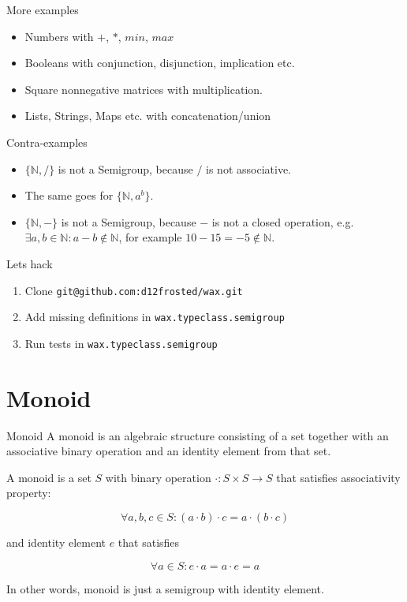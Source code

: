 \documentclass[presentation,aspectratio=169,smaller]{beamer}
\begin{document}
\begin{frame}[label={sec:org2319d22}]{More examples}
\begin{itemize}
\item Numbers with \(+\), \(*\), \(min\), \(max\)
\item Booleans with conjunction, disjunction, implication etc.
\item Square nonnegative matrices with multiplication.
\item Lists, Strings, Maps etc. with concatenation/union
\end{itemize}
\end{frame}

\begin{frame}[label={sec:orgd04373c}]{Contra-examples}
\begin{itemize}
\item \(\{\mathbb{N}, /\}\) is not a Semigroup, because \(/\) is not associative.
\item The same goes for \(\{\mathbb{N}, a^b \}\).
\item \(\{\mathbb{N}, -\}\) is not a Semigroup, because \(-\) is not a closed operation,
e.g. \(\exists a, b \in \mathbb{N}: a - b \notin \mathbb{N}\),
for example \(10 - 15 = -5 \notin \mathbb{N}\).
\end{itemize}
\end{frame}

\begin{frame}[label={sec:orgfa7c860},fragile]{Lets hack}
 \begin{enumerate}
\item Clone \texttt{git@github.com:d12frosted/wax.git}
\item Add missing definitions in \texttt{wax.typeclass.semigroup}
\item Run tests in \texttt{wax.typeclass.semigroup}
\end{enumerate}
\end{frame}

\section*{Monoid}
\label{sec:orgacaea69}

\begin{frame}[label={sec:orgfc3a53d}]{Monoid}
A monoid is an algebraic structure consisting of a set together with an
associative binary operation and an identity element from that set.

\pause

A monoid is a set \(S\) with binary operation \(\cdot : S \times S \rightarrow
S\) that satisfies associativity property:

$$\forall a, b, c \in S : (a \cdot b) \cdot c = a \cdot (b \cdot c)$$

and identity element \(e\) that satisfies

$$\forall a \in S : e \cdot a = a \cdot e = a$$

\pause

In other words, monoid is just a semigroup with identity element.
\end{frame}
\end{document}
